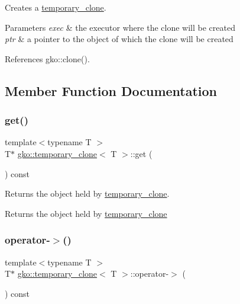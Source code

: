 Creates a \hyperlink{classgko_1_1temporary__clone}{temporary\+\_\+clone}. 


\begin{DoxyParams}{Parameters}
{\em exec} & the executor where the clone will be created \\
\hline
{\em ptr} & a pointer to the object of which the clone will be created \\
\hline
\end{DoxyParams}


References gko\+::clone().



\subsection{Member Function Documentation}
\mbox{\label{classgko_1_1temporary__clone_a38042e39a039070cc97e225435d5ed9e}} 
\subsubsection{\texorpdfstring{get()}{get()}}
{\footnotesize\ttfamily template$<$typename T $>$ \\
T$\ast$ \hyperlink{classgko_1_1temporary__clone}{gko\+::temporary\+\_\+clone}$<$ T $>$\+::get (\begin{DoxyParamCaption}{ }\end{DoxyParamCaption}) const\hspace{0.3cm}{\ttfamily [inline]}}



Returns the object held by \hyperlink{classgko_1_1temporary__clone}{temporary\+\_\+clone}. 

\begin{DoxyReturn}{Returns}
the object held by \hyperlink{classgko_1_1temporary__clone}{temporary\+\_\+clone} 
\end{DoxyReturn}
\mbox{\label{classgko_1_1temporary__clone_a007bc247a9a250dcec8cdadb54710106}} 
\subsubsection{\texorpdfstring{operator-\/$>$()}{operator->()}}
{\footnotesize\ttfamily template$<$typename T $>$ \\
T$\ast$ \hyperlink{classgko_1_1temporary__clone}{gko\+::temporary\+\_\+clone}$<$ T $>$\+::operator-\/$>$ (\begin{DoxyParamCaption}{ }\end{DoxyParamCaption}) const\hspace{0.3cm}{\ttfamily [inline]}}



